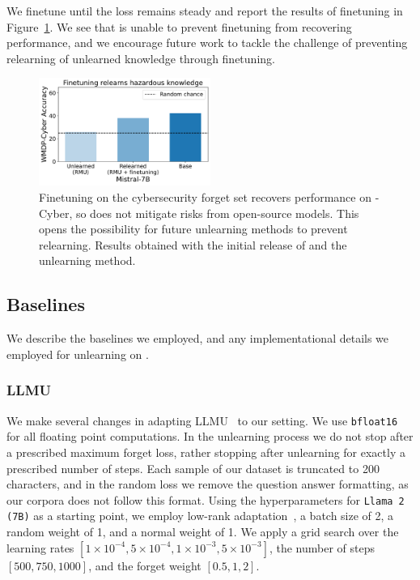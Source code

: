 We finetune until the loss remains steady and report the results of finetuning in Figure~\ref{fig:relearning}. We see that \method{} is unable to prevent finetuning from recovering performance, and we encourage future work to tackle the challenge of preventing relearning of unlearned knowledge through finetuning.
\begin{figure}[t!]
  \centering

\includegraphics[width=0.5\textwidth]{figures/relearned_results.pdf}
\caption{Finetuning on the cybersecurity forget set recovers performance on \benchmark{}-Cyber, so \method{} does not mitigate risks from open-source models. This opens the possibility for future unlearning methods to prevent relearning. Results obtained with the initial release of \benchmark{} and the unlearning method.}
\label{fig:relearning}
\end{figure}
\subsection{Baselines}\label{app:baselines}
We describe the baselines we employed, and any implementational details we employed for unlearning on \method{}.

\subsubsection{LLMU}\label{app:llmu}
We make several changes in adapting LLMU~\citep{yao2023large} to our setting. We use \texttt{bfloat16} for all floating point computations. In the unlearning process we do not stop after a prescribed maximum forget loss, rather stopping after unlearning for exactly a prescribed number of steps. Each sample of our dataset is truncated to 200 characters, and in the random loss we remove the question answer formatting, as our corpora does not follow this format. Using the hyperparameters for \texttt{Llama 2 (7B)} as a starting point, we employ low-rank adaptation~\citep{hu2021lora}, a batch size of 2, a random weight of 1, and a normal weight of 1. We apply a grid search over the learning rates $[1\times 10^{-4}, 5\times 10^{-4}, 1\times 10^{-3}, 5\times 10^{-3}]$, the number of steps $[500, 750, 1000]$, and the forget weight $[0.5, 1, 2]$.



